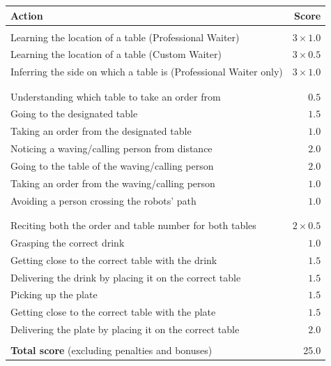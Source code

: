 \begin{tabularx}{\textwidth}{ X r }
	\textbf{Action} & \textbf{Score} \\ \hline
	\textbi{Training phase}  \\
	Learning the location of a table (Professional Waiter) & $3 \times 1.0$ \\
	Learning the location of a table (Custom Waiter) & $3 \times 0.5$ \\
	Inferring the side on which a table is (Professional Waiter only)& $3 \times 1.0$ \\
	\\
	\textbi{Ordering phase}  \\
	Understanding which table to take an order from & $0.5$ \\
	Going to the designated table & $1.5$ \\
	Taking an order from the designated table & $1.0$ \\
	Noticing a waving/calling person from distance & $2.0$ \\
	Going to the table of the waving/calling person & $2.0$ \\
	Taking an order from the waving/calling person & $1.0$ \\
	Avoiding a person crossing the robots' path & $1.0$ \\
	\\
	\textbi{Delivering phase}  \\
	Reciting both the order and table number for both tables & $2 \times 0.5$ \\
	Grasping the correct drink & $1.0$ \\
	Getting close to the correct table with the drink & $1.5$ \\
	Delivering the drink by placing it on the correct table & $1.5$ \\
	Picking up the plate & $1.5$ \\
	Getting close to the correct table with the plate & $1.5$ \\
	Delivering the plate by placing it on the correct table & $2.0$ \\
	\\ \hline
	\textbf{Total score} (excluding penalties and bonuses) & 25.0 \\
\end{tabularx}


